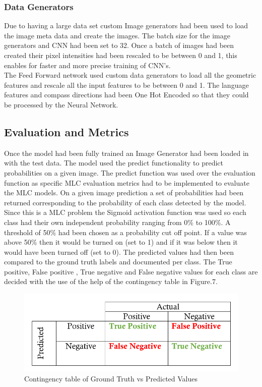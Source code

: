 \documentclass{csfyp}
\begin{document}
\subsubsection{Data Generators}
Due to having a large data set custom Image generators had been used to load the image meta data and create the images. The batch size for the image generators and CNN had been set to 32. Once a batch of images had been created their pixel intensities had been rescaled to be between 0 and 1, this enables for faster and more precise training of CNN’s.
\\
The Feed Forward network used custom data generators to load all the geometric features and rescale all the input features to be between 0 and 1. The language features and compass directions had been One Hot Encoded so that they could be processed by the Neural Network.

\subsection{Evaluation and Metrics}
Once the model had been fully trained an Image Generator had been loaded in with the test data. The model used the predict functionality to predict probabilities on a given image. The predict function was used over the evaluation function as specific MLC evaluation metrics had to be implemented to evaluate the MLC models. On a given image prediction a set of probabilities had been returned corresponding to the probability of each class detected by the model. Since this is a MLC problem the Sigmoid activation function was used so each class had their own independent probability ranging from 0\% to 100\%. A threshold of 50\% had been chosen as a probability cut off point. If a value was above 50\% then it would be turned on (set to 1) and if it was below then it would have been turned off (set to 0). The predicted values had then been compared to the ground truth labels and documented per class. The True positive, False positive , True negative and False negative values for each class are decided with the use of the help of the contingency table in Figure.7.

\begin{figure}[!htbp]
\centering
\includegraphics[scale=0.35]{TPFP.pdf}
\caption{Contingency table of Ground Truth vs Predicted Values }
\end{figure}
\end{document}
